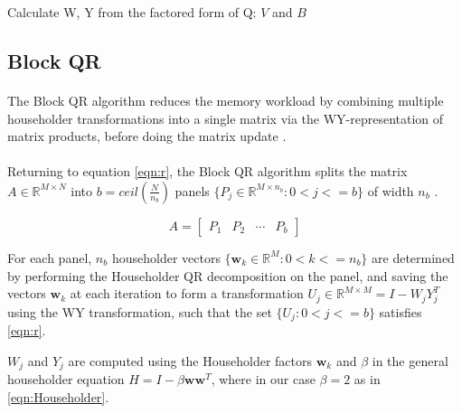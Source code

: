 \documentclass{article}
\begin{document}
\begin{algorithm}
\caption{Calculate W, Y from the factored form of Q: $V$ and $B$}
\label{wy}
\begin{algorithmic}
\ENDFOR
\end{algorithmic}
\end{algorithm}



\subsection{Block QR}
\paragraph{}
 The Block QR algorithm reduces the memory workload by combining multiple householder transformations into a single matrix via the WY-representation of matrix products, before doing the matrix update \cite{BISCHOFC1987TWrf}.

\paragraph{}
Returning to equation \eqref{eqn:r}, the Block QR algorithm splits the matrix $A \in\mathbb{R}^{M\times{}N}$ into $b = ceil(\frac{N}{n_b})$ panels $\{P_j \in \mathbb{R}^{M\times{}n_b} : 0 < j <= b\}$ of width $n_b$ \cite{doi:10.1137/19M1296367}.

\begin{equation}
A = 
\begin{bmatrix}
P_1 & P_2 & \cdots & P_b
\end{bmatrix}
\end{equation}

For each panel, $n_b$ householder vectors $\{\mathbf{w}_k \in \mathbb{R}^M : 0 < k <= n_b\}$ are determined by performing the Householder QR decomposition on the panel, and saving the vectors $\mathbf{w}_k$ at each iteration to form a transformation $U_j \in \mathbb{R}^{M\times M} = I - W_jY_j^T$ using the WY transformation, such that the set $\{U_j : 0 < j <= b\}$ satisfies \eqref{eqn:r}.

$W_j$ and $Y_j$ are computed using the Householder factors $\mathbf{w}_k$ and $\beta{}$ in the general householder equation $H = I - \beta{}\mathbf{w}\mathbf{w}^T$, where in our case $\beta = 2$ as in \eqref{eqn:Householder}.
\end{document}
